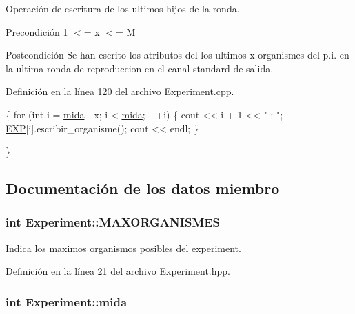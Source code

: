 Operación de escritura de los ultimos hijos de la ronda. 

\begin{DoxyPrecond}{Precondición}
1 $<$= x $<$= M 
\end{DoxyPrecond}
\begin{DoxyPostcond}{Postcondición}
Se han escrito los atributos del los ultimos x organismes del p.\-i. en la ultima ronda de reproduccion en el canal standard de salida. 
\end{DoxyPostcond}


Definición en la línea 120 del archivo Experiment.\-cpp.


\begin{DoxyCode}
\{
    \textcolor{keywordflow}{for} (\textcolor{keywordtype}{int} i = \hyperlink{class_experiment_aec56e0b0a0cda4d67ce25a0921d9ebf7}{mida} - x; i < \hyperlink{class_experiment_aec56e0b0a0cda4d67ce25a0921d9ebf7}{mida}; ++i) \{
        cout << i + 1 << \textcolor{stringliteral}{" : "};
        \hyperlink{class_experiment_a2d3539cb5f6996e83a7d687538411501}{EXP}[i].escribir\_organisme();
        cout << endl;
    \}

\}
\end{DoxyCode}


\subsection{Documentación de los datos miembro}
\hypertarget{class_experiment_a329359965b798fa1023b1b29d6ccf832}{
\subsubsection[{M\-A\-X\-O\-R\-G\-A\-N\-I\-S\-M\-E\-S}]{\setlength{\rightskip}{0pt plus 5cm}int Experiment\-::\-M\-A\-X\-O\-R\-G\-A\-N\-I\-S\-M\-E\-S\hspace{0.3cm}{\ttfamily [private]}}}\label{class_experiment_a329359965b798fa1023b1b29d6ccf832}


Indica los maximos organismos posibles del experiment. 



Definición en la línea 21 del archivo Experiment.\-hpp.

\hypertarget{class_experiment_aec56e0b0a0cda4d67ce25a0921d9ebf7}{
\subsubsection[{mida}]{\setlength{\rightskip}{0pt plus 5cm}int Experiment\-::mida\hspace{0.3cm}{\ttfamily [private]}}}\label{class_experiment_aec56e0b0a0cda4d67ce25a0921d9ebf7}


